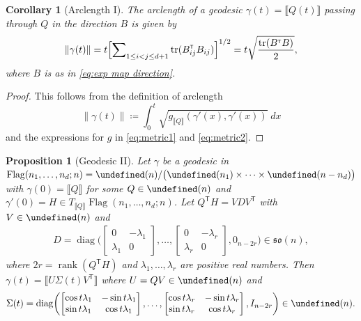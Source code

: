\documentclass[11pt,reqno]{amsart}%
\newtheorem{proposition}[theorem]{Proposition}
\newtheorem{corollary}[theorem]{Corollary}
\theoremstyle{definition}
\theoremstyle{remark}
\newcommand{\tp}{{\scriptscriptstyle\mathsf{T}}}
\newcommand{\lb}{\llbracket}
\newcommand{\rb}{\rrbracket}
\let\O\undefined
\DeclareMathOperator{\Flag}{Flag}
\DeclareMathOperator{\O}{O}
\DeclareMathOperator{\tr}{tr}
\DeclareMathOperator{\rank}{rank}
\begin{document}
\begin{corollary}[Arclength I]\label{cor:arc-length}
The arclength of a geodesic $\gamma(t) = \lb Q(t) \rb$ passing through $Q$ in the direction $B$  is given by
\[
\lVert\gamma(t)  \rVert  = t \Bigl[  \sum\nolimits_{1\le i<j \le d+1} \tr (B_{ij}^\tp  B_{ij}) \Bigr]^{1/2} 
 = t \sqrt{\frac{\tr(B^\tp  B)}{2}},
\]
where $B$ is as in \eqref{eq:exp map direction}.
\end{corollary}
\begin{proof}
This follows from the definition of arclength
\[
\lVert\gamma(t)  \rVert \coloneqq  \int_{0}^t \sqrt{g_{\lb Q \rb} (\gamma'(x), \gamma'(x)) } \; dx
\]
and the expressions for $g$ in \eqref{eq:metric1} and \eqref{eq:metric2}.
\end{proof}

\begin{proposition}[Geodesic II]\label{prop:geodesics2}
Let $\gamma$ be a geodesic in $\Flag(n_1,\dots, n_d;n) = \O(n)/\bigl(\O(n_1)\times \dots \times \O(n-n_d)\bigr)$ with $\gamma(0) = \lb Q \rb$ for some $Q\in \O(n)$ and $\gamma'(0) = H \in T_{\lb Q \rb}  \Flag(n_1,\dots, n_d;n)$. Let $Q^\tp H =  V D V^\tp $ with $V\in \O(n)$ and 
\begin{align}\label{eq:geodesic variable D}
D = \operatorname{diag} \biggl( \begin{bmatrix}
0 & -\lambda_1 \\
\lambda_1 & 0 
\end{bmatrix}, \dots, \begin{bmatrix}
0 & -\lambda_r \\
\lambda_r & 0 
\end{bmatrix}, 0_{n-2r}
\biggr)\in \mathfrak{so}(n),
\end{align}
where $2r = \rank(Q^\tp H )$ and $\lambda_1,\dots,\lambda_r$ are positive real numbers. Then $\gamma(t)  = \lb U \Sigma(t) V^\tp \rb$ where $U = QV\in \O(n)$ and 
\begin{align} \label{eq:geodesic variable sigma}
\Sigma(t) = \operatorname{diag} \biggl(
\begin{bmatrix}
\cos t\lambda_1 & -\sin t\lambda_1 \\
\sin t\lambda_1 & \cos t\lambda_1 
\end{bmatrix}, 
\dots, 
\begin{bmatrix}
\cos t\lambda_r & -\sin t\lambda_r \\
\sin t\lambda_r & \cos t\lambda_r 
\end{bmatrix}, 
I_{n - 2r}
\biggr) \in \O(n).
\end{align}
\end{proposition}
\end{document}
